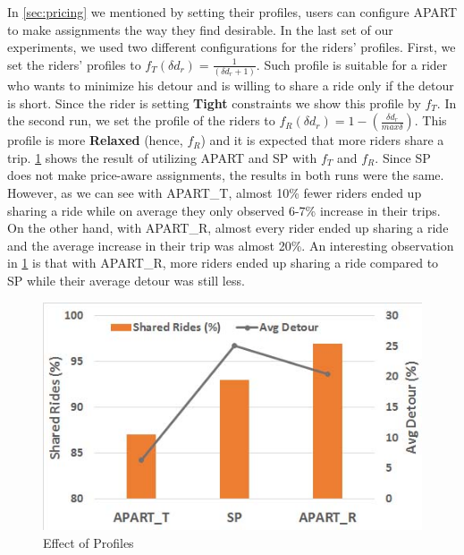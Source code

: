 In \cref{sec:pricing} we mentioned by setting their profiles, users can configure APART to make assignments the way they find desirable. In the last set of our experiments, we used two different configurations for the riders' profiles. First, we set the riders' profiles to $f_T(\delta d_r) = \frac{1}{(\delta d_r + 1)}$. Such profile is suitable for a rider who wants to minimize his detour and is willing to share a ride only if the detour is short. Since the rider is setting \textbf{Tight} constraints we show this profile by $f_T$. In the second run, we set the profile of the riders to $f_R(\delta d_r) = 1 -  (\frac{\delta d_r}{max \delta})$. This profile is more \textbf{Relaxed} (hence, $f_R$) and it is expected that more riders share a trip. \cref{fig:quality} shows the result of utilizing APART and SP with $f_T$ and $f_R$. Since SP does not make price-aware assignments, the results in both runs were the same. However, as we can see with APART\_T, almost 10\% fewer riders ended up sharing a ride while on average they only observed 6-7\% increase in their trips. On the other hand, with APART\_R, almost every rider ended up sharing a ride and the average increase in their trip was almost 20\%. An interesting observation in \cref{fig:quality} is that with APART\_R, more riders ended up sharing a ride compared to SP while their average detour was still less.

\begin{figure}[h]
	\centering
    \includegraphics[width = 0.45\columnwidth]{fig/quality.jpg}
    \vspace{-0.15in}
    \caption{Effect of Profiles}
    \label{fig:quality}
\end{figure}

